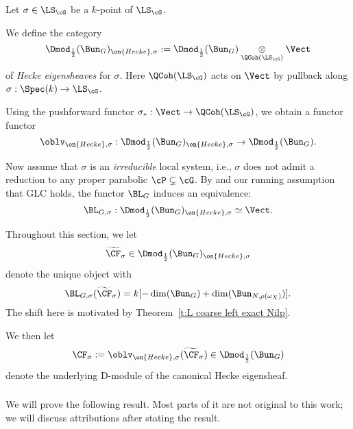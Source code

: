 \documentclass[9pt]{amsart}
\theoremstyle{remark}
\theoremstyle{definition}
\theoremstyle{remark}
\newcommand{\thmref}[1]{Theorem~\ref{#1}}
\numberwithin{equation}{section}
\begin{document}
Let $\sigma \in \LS_{\cG}$ be a $k$-point of $\LS_{\cG}$.

\medskip 

We define the category
%
\[
\Dmod_{\frac{1}{2}}(\Bun_G)_{\on{Hecke},\sigma} := 
\Dmod_{\frac{1}{2}}(\Bun_G) \underset{\QCoh(\LS_{\cG})}{\otimes} \Vect
\]
%
\noindent of \emph{Hecke eigensheaves} for $\sigma$. Here $\QCoh(\LS_{\cG})$ acts
on $\Vect$ by pullback along $\sigma:\Spec(k) \to \LS_{\cG}$.

\medskip

Using the pushforward functor 
$\sigma_*:\Vect \to \QCoh(\LS_{\cG})$, we obtain a functor
functor
\[
\oblv_{\on{Hecke},\sigma}: \Dmod_{\frac{1}{2}}(\Bun_G)_{\on{Hecke},\sigma} \to 
\Dmod_{\frac{1}{2}}(\Bun_G).
\]

\medskip 

Now assume that $\sigma$ is an \emph{irreducible} local system, i.e., $\sigma$ does
not admit a reduction to any proper parabolic $\cP \subsetneq \cG$. 
By \cite[Prop. 13.3.3]{AG} and our running assumption that GLC holds, the functor
$\BL_G$ induces an equivalence:
%
\[
\BL_{G,\sigma}:\Dmod_{\frac{1}{2}}(\Bun_G)_{\on{Hecke},\sigma} \simeq \Vect.
\]

Throughout this section, we let
%
\[
\widetilde{\CF}_{\sigma} \in \Dmod_{\frac{1}{2}}(\Bun_G)_{\on{Hecke},\sigma}
\]
%
\noindent denote the unique object with
%
\[
\BL_{G,\sigma}(\widetilde{\CF}_{\sigma}) = k[-\dim(\Bun_G)+\dim(\Bun_{N,\rho(\omega_X)})].
\]
%
\noindent 
The shift here is motivated by \thmref{t:L coarse left exact Nilp}.

\medskip 

We then let
%
\[
\CF_{\sigma} := \oblv_{\on{Hecke},\sigma}(\widetilde{\CF}_{\sigma}) \in \Dmod_{\frac{1}{2}}(\Bun_G)
\]
%
\noindent denote the underlying D-module of the canonical
Hecke eigensheaf.

\subsubsection{}

We will prove the following result. Most parts of it 
are not original to this work; we will discuss 
attributions after stating the result.
\end{document}
